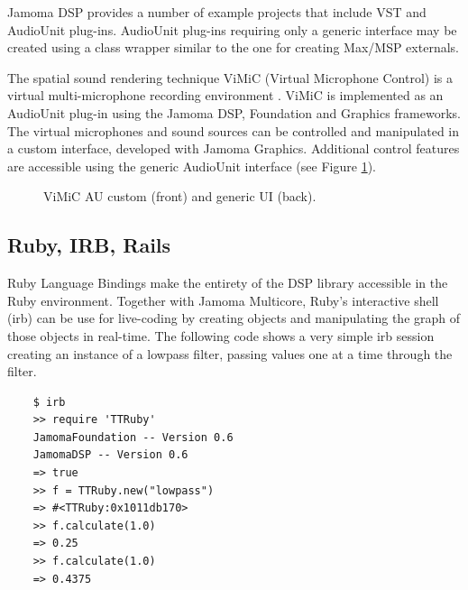 \documentclass[twoside,10pt]{article}
\begin{document}
Jamoma DSP provides a number of example projects that include VST and AudioUnit plug-ins.  AudioUnit plug-ins requiring only a generic interface may be created using a class wrapper similar to the one for creating Max/MSP externals.  

The spatial sound rendering technique ViMiC (Virtual Microphone Control) is a virtual multi-microphone recording environment \cite{CMJ08-VIMIC}.  ViMiC is implemented as an AudioUnit plug-in using the Jamoma DSP, Foundation and Graphics frameworks.  The virtual microphones and sound sources can be controlled and manipulated in a custom interface, developed with Jamoma Graphics.  Additional control features are accessible using the generic AudioUnit interface (see Figure \ref{fig:vimic}).


\begin{figure}[htbp]
\centerline{}
\caption{ViMiC AU custom (front) and generic UI (back).}
\label{fig:vimic}
\end{figure}


\subsection{Ruby, IRB, Rails}

Ruby Language Bindings make the entirety of the DSP library accessible in the Ruby environment.  Together with Jamoma Multicore, Ruby's interactive shell (irb) can be use for live-coding by creating objects and manipulating the graph of those objects in real-time.  The following code shows a very simple irb session creating an instance of a lowpass filter, passing values one at a time through the filter.

\begin{lstlisting}
    $ irb
    >> require 'TTRuby'
    JamomaFoundation -- Version 0.6
    JamomaDSP -- Version 0.6
    => true
    >> f = TTRuby.new("lowpass")
    => #<TTRuby:0x1011db170>
    >> f.calculate(1.0)
    => 0.25
    >> f.calculate(1.0)
    => 0.4375
\end{lstlisting}
\end{document}
